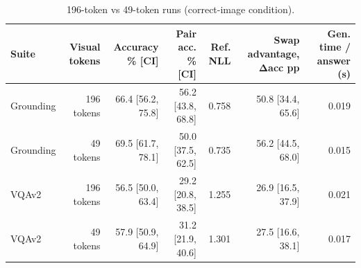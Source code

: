 \begin{table}[t]
\centering\small
\begin{tabular}{lrrrrrr}
\toprule
Suite & Visual tokens & Accuracy \% [CI] & Pair acc. \% [CI] & Ref. NLL & Swap advantage, Δacc pp & Gen. time / answer (s) \\
\midrule
Grounding & 196 tokens & 66.4 [56.2, 75.8] & 56.2 [43.8, 68.8] & 0.758 & 50.8 [34.4, 65.6] & 0.019 \\
Grounding & 49 tokens & 69.5 [61.7, 78.1] & 50.0 [37.5, 62.5] & 0.735 & 56.2 [44.5, 68.0] & 0.015 \\
VQAv2 & 196 tokens & 56.5 [50.0, 63.4] & 29.2 [20.8, 38.5] & 1.255 & 26.9 [16.5, 37.9] & 0.021 \\
VQAv2 & 49 tokens & 57.9 [50.9, 64.9] & 31.2 [21.9, 40.6] & 1.301 & 27.5 [16.6, 38.1] & 0.017 \\
\bottomrule
\end{tabular}
\caption{196-token vs 49-token runs (correct-image condition).}
\label{tab:task2_compression}
\end{table}
